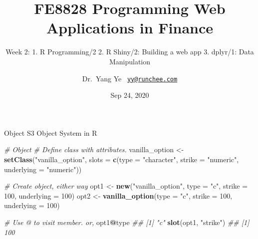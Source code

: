 \documentclass[
  10pt,
  ignorenonframetext,
  serif]{beamer}
\title{FE8828 Programming Web Applications in Finance}
\subtitle{Week 2: 1. R Programming/2 2. R Shiny/2: Building a web app 3.
dplyr/1: Data Manipulation}
\author{Dr.~Yang Ye
~\href{mailto:yy@runchee.com}{\nolinkurl{yy@runchee.com}}}
\date{Sep 24, 2020}
\institute{Nanyang Business School}
\newenvironment{Shaded}{\begin{snugshade}}{\end{snugshade}}
\newcommand{\CommentTok}[1]{\textcolor[rgb]{0.56,0.35,0.01}{\textit{#1}}}
\newcommand{\DataTypeTok}[1]{\textcolor[rgb]{0.13,0.29,0.53}{#1}}
\newcommand{\DecValTok}[1]{\textcolor[rgb]{0.00,0.00,0.81}{#1}}
\newcommand{\KeywordTok}[1]{\textcolor[rgb]{0.13,0.29,0.53}{\textbf{#1}}}
\newcommand{\NormalTok}[1]{#1}
\newcommand{\OperatorTok}[1]{\textcolor[rgb]{0.81,0.36,0.00}{\textbf{#1}}}
\newcommand{\StringTok}[1]{\textcolor[rgb]{0.31,0.60,0.02}{#1}}
\begin{document}
\frame{\titlepage}

\begin{frame}[allowframebreaks]
  \tableofcontents[hideallsubsections]
\end{frame}
\begin{frame}
\end{frame}

\begin{frame}[fragile]{Object}
\protect\hypertarget{object}{}
S3 Object System in R

\begin{Shaded}
\begin{Highlighting}[]
\CommentTok{\# Object}
\CommentTok{\# Define class with attributes.}
\NormalTok{vanilla\_option \textless{}{-}}\StringTok{ }\KeywordTok{setClass}\NormalTok{(}\StringTok{"vanilla\_option"}\NormalTok{,}
                           \DataTypeTok{slots =} \KeywordTok{c}\NormalTok{(}\DataTypeTok{type =} \StringTok{"character"}\NormalTok{,}
                                     \DataTypeTok{strike =} \StringTok{"numeric"}\NormalTok{,}
                                     \DataTypeTok{underlying =} \StringTok{"numeric"}\NormalTok{))}

\CommentTok{\# Create object, either way}
\NormalTok{opt1 \textless{}{-}}\StringTok{ }\KeywordTok{new}\NormalTok{(}\StringTok{"vanilla\_option"}\NormalTok{, }\DataTypeTok{type =} \StringTok{"c"}\NormalTok{, }\DataTypeTok{strike =} \DecValTok{100}\NormalTok{, }\DataTypeTok{underlying =} \DecValTok{100}\NormalTok{)}
\NormalTok{opt2 \textless{}{-}}\StringTok{ }\KeywordTok{vanilla\_option}\NormalTok{(}\DataTypeTok{type =} \StringTok{"c"}\NormalTok{, }\DataTypeTok{strike =} \DecValTok{100}\NormalTok{, }\DataTypeTok{underlying =} \DecValTok{100}\NormalTok{)}

\CommentTok{\# Use @ to visit member. or,}
\NormalTok{opt1}\OperatorTok{@}\NormalTok{type}
\CommentTok{\#\# [1] "c"}
\KeywordTok{slot}\NormalTok{(opt1, }\StringTok{"strike"}\NormalTok{)}
\CommentTok{\#\# [1] 100}
\end{Highlighting}
\end{Shaded}
\end{frame}
\end{document}
